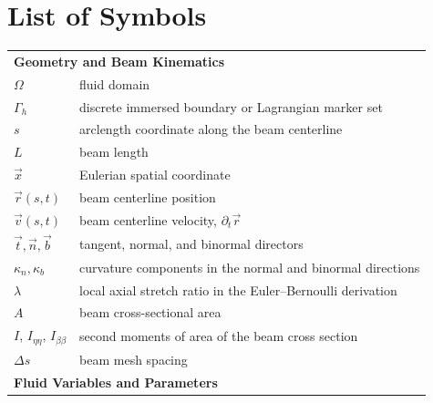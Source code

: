 \chapter{List of Symbols}

\def\arraystretch{1.5}
\begin{longtable}[l]{p{} p{}}
    \multicolumn{2}{l}{\textbf{Geometry and Beam Kinematics}}                                        \\
    $\Omega$               & fluid domain                                                            \\
    $\Gamma_h$             & discrete immersed boundary or Lagrangian marker set                     \\
    $s$                    & arclength coordinate along the beam centerline                          \\
    $L$                    & beam length                                                             \\
    $\vec x$               & Eulerian spatial coordinate                                             \\
    $\vec r(s,t)$          & beam centerline position                                                \\
    $\vec v(s,t)$          & beam centerline velocity, $\partial_t\vec r$                            \\
    $\vec t,\vec n,\vec b$ & tangent, normal, and binormal directors                                 \\
    $\kappa_n,\kappa_b$    & curvature components in the normal and binormal directions              \\
    $\lambda$              & local axial stretch ratio in the Euler--Bernoulli derivation            \\
    $A$                    & beam cross-sectional area                                               \\
    $I$, $I_{\eta\eta}$, $I_{\beta\beta}$
                           & second moments of area of the beam cross section                        \\
    $\Delta s$             & beam mesh spacing                                                       \\
    \multicolumn{2}{l}{\textbf{Fluid Variables and Parameters}}                                      \\

\end{longtable}
